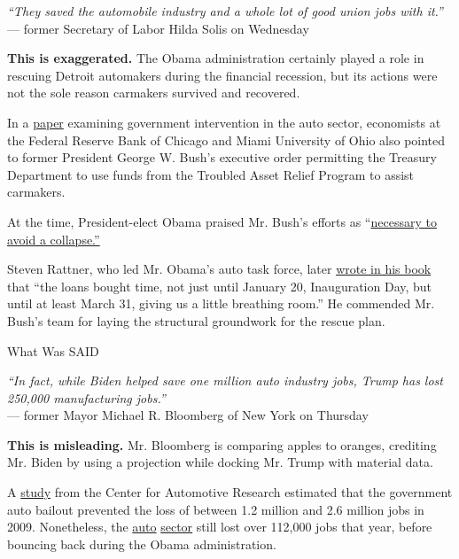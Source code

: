 \emph{``They saved the automobile industry and a whole lot of good union
jobs with it.''}\\
--- former Secretary of Labor Hilda Solis on Wednesday

\textbf{This is exaggerated.} The Obama administration certainly played
a role in rescuing Detroit automakers during the financial recession,
but its actions were not the sole reason carmakers survived and
recovered.

In a
\href{https://papers.ssrn.com/sol3/papers.cfm?abstract_id=2109502}{paper}
examining government intervention in the auto sector, economists at the
Federal Reserve Bank of Chicago and Miami University of Ohio also
pointed to former President George W. Bush's executive order permitting
the Treasury Department to use funds from the Troubled Asset Relief
Program to assist carmakers.

At the time, President-elect Obama praised Mr. Bush's efforts as
``\href{https://www.newyorker.com/news/john-cassidy/an-inconvenient-truth-it-was-george-w-bush-who-bailed-out-the-automakers}{necessary
to avoid a collapse.''}

Steven Rattner, who led Mr. Obama's auto task force, later
\href{https://www.google.com/books/edition/Overhaul/zaXm0yubX9IC?hl=en\&gbpv=1\&bsq=Bush}{wrote
in his book} that ``the loans bought time, not just until January 20,
Inauguration Day, but until at least March 31, giving us a little
breathing room.'' He commended Mr. Bush's team for laying the structural
groundwork for the rescue plan.

What Was SAID

\emph{``In fact, while Biden helped save one million auto industry jobs,
Trump has lost 250,000 manufacturing jobs.''}\\
--- former Mayor Michael R. Bloomberg of New York on Thursday

\textbf{This is misleading.} Mr. Bloomberg is comparing apples to
oranges, crediting Mr. Biden by using a projection while docking Mr.
Trump with material data.

A
\href{https://www.cargroup.org/wp-content/uploads/2017/02/The-Effect-on-the-US-Economy-of-the-Succesful-Restructuring-of-General-Motors.pdf}{study}
from the Center for Automotive Research estimated that the government
auto bailout prevented the loss of between 1.2 million and 2.6 million
jobs in 2009. Nonetheless, the
\href{https://data.bls.gov/timeseries/CES3133600101?data_tool=XGtable}{auto}
\href{https://data.bls.gov/timeseries/CES4244100001?data_tool=XGtable}{sector}
still lost over 112,000 jobs that year, before bouncing back during the
Obama administration.

